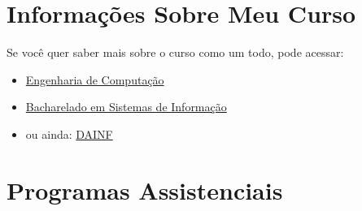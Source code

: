 \documentclass[a4paper,12pt,openany]{article}
\begin{document}
\section{Informações Sobre Meu Curso} \label{sec:InfoCurso}
Se você quer saber mais sobre o curso como um todo, pode acessar:

\begin{itemize}
\item \href{http://www.utfpr.edu.br/estrutura-universitaria/pro-reitorias/prograd/catalogo-de-cursos-da-utfpr/curitiba/engenharia-de-computacao}{Engenharia de Computação}

\item \href{http://www.utfpr.edu.br/estrutura-universitaria/pro-reitorias/prograd/catalogo-de-cursos-da-utfpr/curitiba/sistemas-de-informacao}{Bacharelado em Sistemas de Informação}

\item ou ainda: \href{http://www2.dainf.ct.utfpr.edu.br/}{DAINF}

\end{itemize}






\newpage
\section{Programas Assistenciais} \label{Sec:assist}
\end{document}
